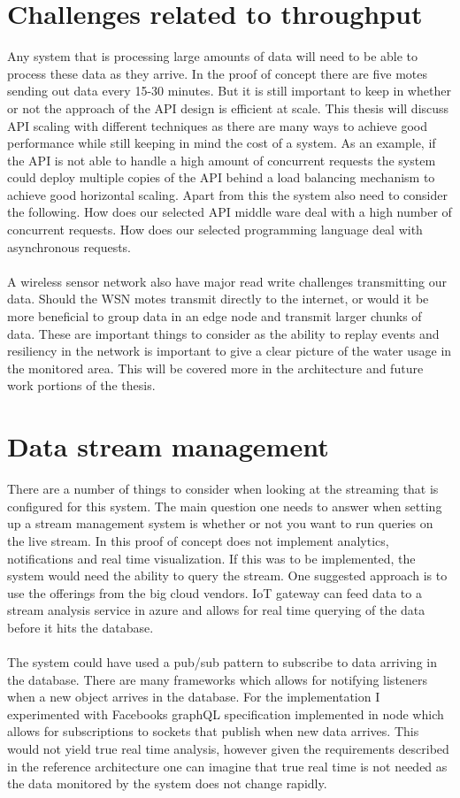 \documentclass[]{uiophd}
\begin{document}
\section{Challenges related to throughput}

Any system that is processing large amounts of data will need to be able to process these data as they arrive. In the proof of concept there are five motes sending out data every 15-30 minutes. But it is still important to keep in whether or not the approach of the API design is efficient at scale. This thesis will discuss API scaling with different techniques as there are many ways to achieve good performance while still keeping in mind the cost of a system. As an example, if the API is not able to handle a high amount of concurrent requests the system could deploy multiple copies of the API behind a load balancing mechanism to achieve good horizontal scaling. Apart from this the system also need to consider the following. How does our selected API middle ware deal with a high number of concurrent requests. How does our selected programming language deal with asynchronous requests.
\\\\
A wireless sensor network also have major read write challenges transmitting our data. Should the WSN motes transmit directly to the internet, or would it be more beneficial to group data in an edge node and transmit larger chunks of data. These are important things to consider as the ability to replay events and resiliency in the network is important to give a clear picture of the water usage in the monitored area. This will be covered more in the architecture and future work portions of the thesis.

\section{Data stream management}
There are a number of things to consider when looking at the streaming that is configured for this system. The main question one needs to answer when setting up a stream management system is whether or not you want to run queries on the live stream. In this proof of concept does not implement analytics, notifications and real time visualization. If this was to be implemented, the system would need the ability to query the stream. One suggested approach is to use the offerings from the big cloud vendors. IoT gateway can feed data to a stream analysis service in azure and allows for real time querying of the data before it hits the database.
\\\\
The system could have used a pub/sub pattern to subscribe to data arriving in the database. There are many frameworks which allows for notifying listeners when a new object arrives in the database. For the implementation I experimented with Facebooks graphQL specification implemented in node which allows for subscriptions to sockets that publish when new data arrives. This would not yield true real time analysis, however given the requirements described in the reference architecture one can imagine that true real time is not needed as the data monitored by the system does not change rapidly.
\end{document}
